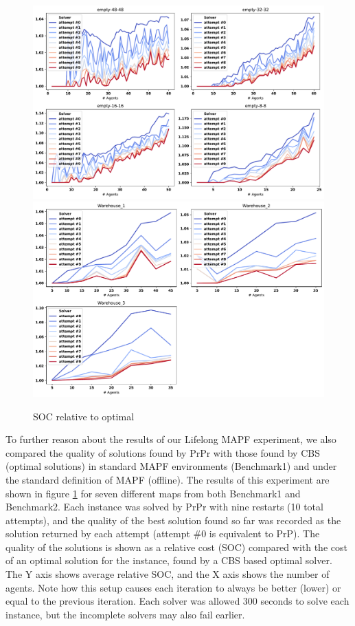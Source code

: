 \documentclass{article}
\newcommand{\benchone}{Benchmark1\xspace}
\newcommand{\benchtwo}{Benchmark2\xspace}
\newcommand{\soc}{SOC\xspace}
\newcommand{\lm}{Lifelong MAPF\xspace}
\begin{document}
\begin{figure}[t]
\centering
\includegraphics[width=\columnwidth]
    {figures/PrPr_vs_opt_empty.pdf}
    \includegraphics[width=\columnwidth]
    {figures/PrPr_vs_opt_warehouse.pdf}
\caption{\soc relative to optimal}
\label{fig:PrPr_vs_opt}
\end{figure}

To further reason about the results of our \lm experiment, we also compared the quality of solutions found by PrPr with those found by CBS (optimal solutions) in standard MAPF environments (\benchone) and under the standard definition of MAPF (offline).
The results of this experiment are shown in figure \ref{fig:PrPr_vs_opt} for seven different maps from both \benchone and \benchtwo. Each instance was solved by PrPr with nine restarts (10 total attempts), and the quality of the best solution found so far was recorded as the solution returned by each attempt (attempt \#0 is equivalent to PrP). The quality of the solutions is shown as a relative cost (\soc) compared with the cost of an optimal solution for the instance, found by a CBS \cite{sharon2015conflict} based optimal solver. The Y axis shows average relative \soc, and the X axis shows the number of agents. Note how this setup causes each iteration to always be better (lower) or equal to the previous iteration. Each solver was allowed 300 seconds to solve each instance, but the incomplete solvers may also fail earlier. 
\end{document}
